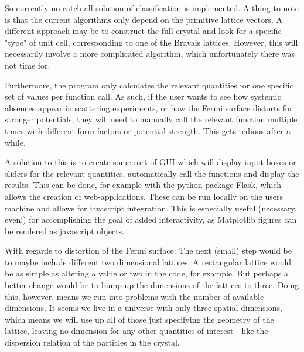 \documentclass[main.tex]{subfiles}
\begin{document}
	So currently no catch-all solution of classification is implemented. A thing to note is that the current algorithms only depend on the primitive lattice vectors. A different approach may be to construct the full crystal and look for a specific "type" of unit cell, corresponding to one of the Bravais lattices. However, this will necessarily involve a more complicated algorithm, which unfortunately there was not time for.
	
	Furthermore, the program only calculates the relevant quantities for one specific set of values per function call. As such, if the user wants to see how systemic absences appear in scattering experiments, or how the Fermi surface distorts for stronger potentials, they will need to manually call the relevant function multiple times with different form factors or potential strength. This gets tedious after a while.
	
	A solution to this is to create some sort of GUI which will display input boxes or sliders for the relevant quantities, automatically call the functions and display the results. This can be done, for example with the python package \href{http://flask.pocoo.org/}{Flask}, which allows the creation of web-applications. These can be run locally on the users machine and allows for javascript integration. This is especially useful (necessary, even!) for accomplishing the goal of added interactivity, as Matplotlib figures can be rendered as javascript objects.
	
	With regards to distortion of the Fermi surface: The next (small) step would be to maybe include different two dimensional lattices. A rectangular lattice would be as simple as altering a value or two in the code, for example. But perhaps a better change would be to bump up the dimensions of the lattices to three. Doing this, however, means we run into problems with the number of available dimensions. It seems we live in a universe with only three spatial dimensions, which means we will use up all of those just specifying the geometry of the lattice, leaving no dimension for any other quantities of interest - like the dispersion relation of the particles in the crystal.
	
\end{document}
